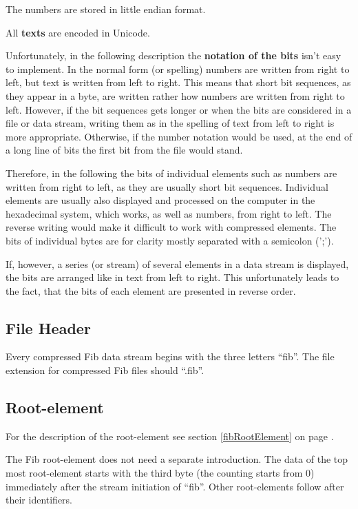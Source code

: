 The numbers are stored in little endian format.

All \textbf{texts} are encoded in Unicode.

Unfortunately, in the following description the \textbf{notation of the bits} isn't easy to implement. In the normal form (or spelling) numbers are written from right to left, but text is written from left to right. This means that short bit sequences, as they appear in a byte, are written rather how numbers are written from right to left. However, if the bit sequences gets longer or when the bits are considered in a file or data stream, writing them as in the spelling of text from left to right is more appropriate. Otherwise, if the number notation would be used, at the end of a long line of bits the first bit from the file would stand.

Therefore, in the following the bits of individual elements such as numbers are written from right to left, as they are usually short bit sequences. Individual elements are usually also displayed and processed on the computer in the hexadecimal system, which works, as well as numbers, from right to left. The reverse writing would make it difficult to work with compressed elements. The bits of individual bytes are for clarity mostly separated with a semicolon (';').

If, however, a series (or stream) of several elements in a data stream is displayed, the bits are arranged like in text from left to right. This unfortunately leads to the fact, that the bits of each element are presented in reverse order.



\subsection{File Header}

Every compressed Fib data stream begins with the three letters ``fib''. The file extension for compressed Fib files should ``.fib''.


\subsection{Root-element}
\label{secCompressedRootElement}

For the description of the root-element see section \ref{fibRootElement} on page \pageref{fibRootElement} .

The Fib root-element does not need a separate introduction. The data of the top most root-element starts with the third byte (the counting starts from 0) immediately after the stream initiation of ``fib''. Other root-elements follow after their identifiers.

